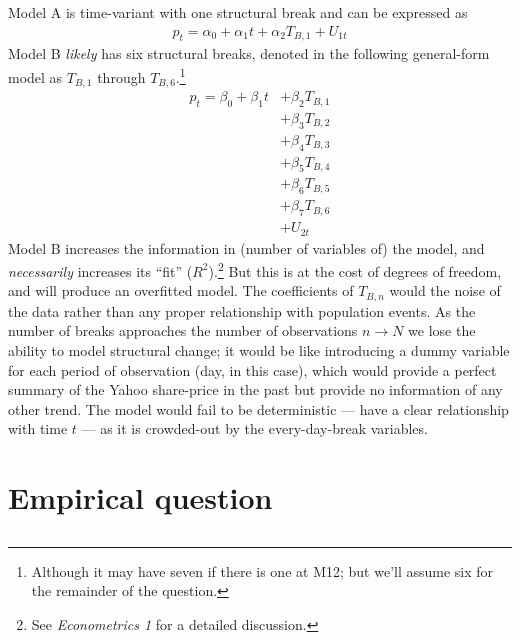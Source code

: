 \documentclass{article}
\begin{document}
    Model A is time-variant with one structural break and can be expressed as
      \begin{align*}
        p_{t} = \alpha_0 + \alpha_1 t + \alpha_2 T_{B,1} + U_{1t}
      \end{align*}
    Model B \textit{likely} has six structural breaks, denoted in the following general-form model as $T_{B,1}$ through $T_{B,6}$.\footnote{Although it may have seven if there is one at M12; but we'll assume six for the remainder of the question.}
      \begin{align*}
        p_{t} = \beta_0 + \beta_1 t &+ \beta_2 T_{B,1}  \\
                                    &+ \beta_3 T_{B,2} \\
                                    &+ \beta_4 T_{B,3} \\
                                    &+ \beta_5 T_{B,4} \\
                                    &+ \beta_6 T_{B,5} \\
                                    &+ \beta_7 T_{B,6} \\
                                    &+ U_{2t}
      \end{align*}
    Model B increases the information in (number of variables of) the model, and \textit{necessarily} increases its ``fit'' ($R^2$).\footnote{See \textit{Econometrics 1} for a detailed discussion.} But this is at the cost of degrees of freedom, and will produce an overfitted model. The coefficients of $T_{B,n}$ would the noise of the data rather than any proper relationship with population events. As the number of breaks approaches the number of observations $n \xrightarrow\ N$ we lose the ability to model structural change; it would be like introducing a dummy variable for each period of observation (day, in this case), which would provide a perfect summary of the Yahoo share-price in the past but provide no information of any other trend. The model would fail to be deterministic --- have a clear relationship with time $t$ --- as it is crowded-out by the every-day-break variables.


  \newpage  
\section{Empirical question}

\subsection{}\label{subsec21}
\end{document}
